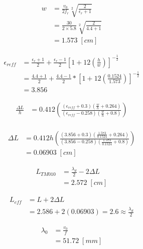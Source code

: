 \documentclass[lettersize,journal]{IEEEtran}
\begin{document}
\begin{align}
\label{eq:des_w}
w &=\frac{v_0}{2 f_r} \sqrt[2]{\frac{2}{\epsilon_r+1}} \\ \nonumber
 &= \frac{30}{2 \times 5.8}\sqrt[2]{\frac{2}{4.4+1}} \\ \nonumber 
 & =1.573 \; [cm]
\end{align}


\begin{align}
    \label{eq:e_eff}
    \epsilon_{reff} &= \frac{\epsilon_r+1}{2}+\frac{\epsilon_r-1}{2}\left[1+12\left(\frac{h}{w}\right)\right]^{-\frac{1}{2}} \\ \nonumber
    &=\frac{4.4+1}{2}+\frac{4.4-1}{2}\ast\left[1+12\left(\frac{0.1524}{1.573}\right)\right]^{-\frac{1}{2}} \\ \nonumber
    &=3.856
\end{align}

\begin{align}
    \label{eq:delta_L_h}
    \frac{\Delta L}{h} &= 0.412 \left(\frac{\left(\epsilon_{reff}+0.3\right)\left(\frac{w}{h}+0.264\right)}{\left(\epsilon_{reff}-0.258\right)\left(\frac{w}{h}+0.8\right)} \right) \\  \nonumber 
\end{align}

\begin{align}
    \label{eq:delta_L}
    \Delta L &= 0.412h \left( \frac{\left(3.856+0.3\right)\left(\frac{1.573}{0.1524}+0.264\right)}{\left(3.856-0.258\right)\left(\frac{1.573}{0.1524}+0.8\right)} \right) \\ \nonumber
    &= 0.06903 \; [cm]
\end{align}

\begin{align}
    \label{eq:L_TM}
    L_{TM010}&=\frac{\lambda_d}{2}-2 \Delta L \\ \nonumber
    &=2.572 \; [cm]
\end{align}

\begin{align}
    \label{eq:L_eff}
    L_{eff}&=L+2 \Delta L \\ \nonumber
    &= 2.586+2\left(0.06903\right)=2.6\approx\frac{\lambda_d}{2}
\end{align}

\begin{align}
    \label{eq:lambda_0}
    \lambda_0&=\frac{v_0}{f} \\ \nonumber
    &=51.72 \; [mm]
\end{align}
\end{document}
